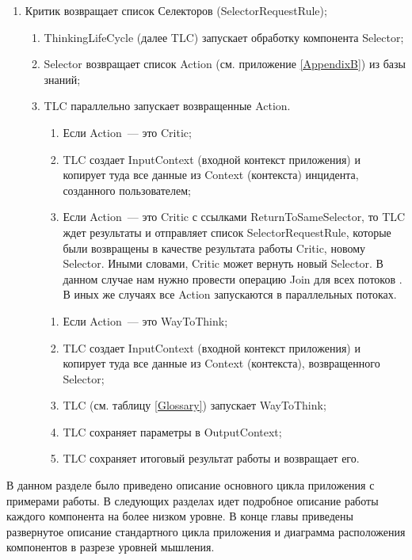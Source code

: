 \begin{enumerate}
	\item Критик возвращает список Селекторов (SelectorRequestRule);
	\begin{enumerate}
	\item ThinkingLifeCycle (далее TLC) запускает обработку компонента Selector;
	\item Selector возвращает список Action (см. приложение \ref{AppendixB}) из базы знаний;
	\item TLC параллельно запускает возвращенные Action.
	\begin{enumerate}
	\item Если Action~--- это Critic;
	\item TLC создает InputContext (входной контекст приложения) и копирует туда все данные из Context (контекста) инцидента, созданного пользователем;
	\item Если Action~--- это Critic с ссылками ReturnToSameSelector, то TLC ждет результаты и отправляет список SelectorRequestRule, которые были возвращены в качестве результата работы Critic, новому Selector. Иными словами, Critic может вернуть новый Selector. В данном случае нам нужно провести операцию Join для всех потоков \cite{JavaConcurrency}. В иных же случаях все Action запускаются в параллельных потоках.
	\end{enumerate} 
	\begin{enumerate}
	\item Если Action~--- это WayToThink;
	\item TLC создает InputContext (входной контекст приложения) и копирует туда все данные из Context (контекста), возвращенного Selector;
	\item TLC (см. таблицу \ref{Glossary}) запускает WayToThink;
	\item TLC сохраняет параметры в OutputContext;
	\item TLC сохраняет итоговый результат работы и возвращает его. 
	\end{enumerate} 
	\end{enumerate}
\end{enumerate} \par
В данном разделе было приведено описание основного цикла приложения с примерами работы. В следующих разделах идет подробное описание работы каждого компонента на более низком уровне. В конце главы приведены развернутое описание стандартного цикла приложения и диаграмма расположения компонентов в разрезе уровней мышления.

